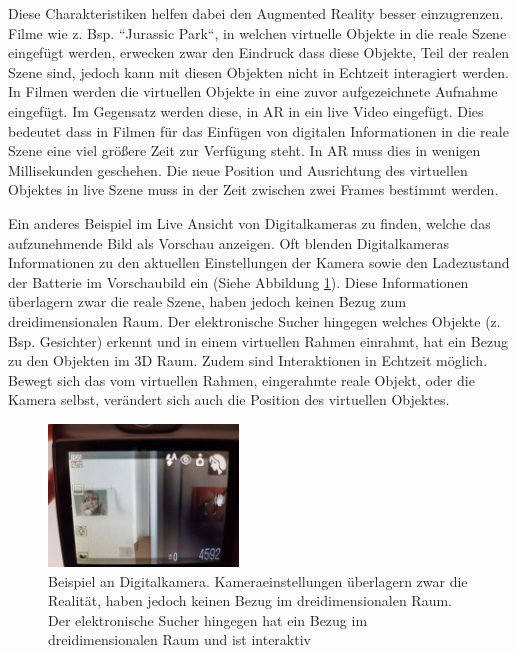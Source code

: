 Diese Charakteristiken helfen dabei den Augmented Reality besser einzugrenzen. \cite{Azuma.1997} Filme wie z. Bsp. ``Jurassic Park``, in welchen virtuelle Objekte in die reale Szene eingefügt werden, 
erwecken zwar den Eindruck dass diese Objekte, Teil der realen Szene sind, jedoch kann mit diesen Objekten nicht in Echtzeit interagiert werden. \cite{Tonnis2010} In Filmen werden die virtuellen Objekte in eine zuvor aufgezeichnete Aufnahme eingefügt. 
Im Gegensatz werden diese, in AR in ein live Video eingefügt. Dies bedeutet dass in  Filmen für das Einfügen von digitalen Informationen in die reale Szene eine viel größere Zeit zur Verfügung steht. 
In AR muss dies in wenigen Millisekunden geschehen. Die neue Position und Ausrichtung des virtuellen Objektes in live Szene muss in der Zeit zwischen zwei Frames bestimmt werden.

Ein anderes Beispiel im Live Ansicht von Digitalkameras zu finden, welche das aufzunehmende Bild als Vorschau anzeigen. Oft blenden Digitalkameras Informationen zu den aktuellen Einstellungen der Kamera sowie den Ladezustand der Batterie im Vorschaubild ein (Siehe Abbildung \ref{img:ar_camera_example}).  
Diese Informationen überlagern zwar die reale Szene, haben jedoch keinen Bezug zum dreidimensionalen Raum. Der elektronische Sucher hingegen welches Objekte (z. Bsp. Gesichter) erkennt und in einem virtuellen Rahmen einrahmt, hat ein Bezug zu den Objekten im 3D Raum. Zudem sind Interaktionen in Echtzeit möglich. Bewegt sich das vom virtuellen Rahmen, eingerahmte reale Objekt, oder die Kamera selbst, verändert sich auch die Position des virtuellen Objektes. 

\begin{figure}
	\centering
	\includegraphics[width=0.45\textwidth]{resources/fundamentals/example_camera_screen_ar}
	\caption{Beispiel an Digitalkamera. Kameraeinstellungen überlagern zwar die Realität, haben jedoch keinen Bezug im dreidimensionalen Raum. Der elektronische Sucher hingegen hat ein Bezug im dreidimensionalen Raum und ist interaktiv \cite{Beispiel Dititalkamera}}
	\label{img:ar_camera_example}
\end{figure}

